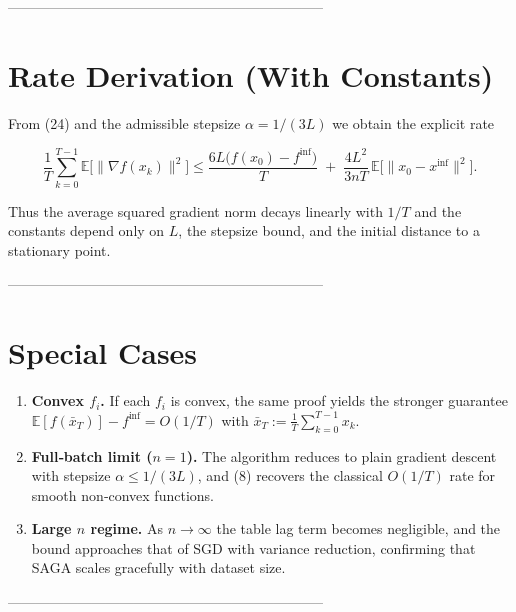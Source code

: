 \documentclass{article}
\newcommand{\E}{\mathbb{E}}
\newcommand{\grad}{\nabla}
\begin{document}
--------------------------------------------------------------------

\section*{Rate Derivation (With Constants)}
From (24) and the admissible stepsize $\alpha=1/(3L)$ we obtain the explicit rate  

\[
\frac{1}{T}\sum_{k=0}^{T-1}\E\!\bigl[\|\grad f(x_k)\|^{2}\bigr]
\le
\frac{6L\bigl(f(x_0)-f^{\inf}\bigr)}{T}
\;+\;
\frac{4L^{2}}{3nT}\,\E\!\bigl[\|x_0-x^{\inf}\|^{2}\bigr].
\tag{25}
\]

Thus the average squared gradient norm decays linearly with $1/T$ and the constants depend only on $L$, the stepsize bound, and the initial distance to a stationary point.

--------------------------------------------------------------------

\section*{Special Cases}
\begin{enumerate}[label=\alph*)]
\item \textbf{Convex $f_i$.} If each $f_i$ is convex, the same proof yields the stronger guarantee  
$\E[f(\bar x_T)]-f^{\inf}=O(1/T)$ with $\bar x_T:=\frac1T\sum_{k=0}^{T-1}x_k$.
\item \textbf{Full‑batch limit ($n=1$).} The algorithm reduces to plain gradient descent with stepsize $\alpha\le 1/(3L)$, and (8) recovers the classical $O(1/T)$ rate for smooth non‑convex functions.
\item \textbf{Large $n$ regime.} As $n\to\infty$ the table lag term becomes negligible, and the bound approaches that of SGD with variance reduction, confirming that SAGA scales gracefully with dataset size.
\end{enumerate}

--------------------------------------------------------------------
\end{document}
